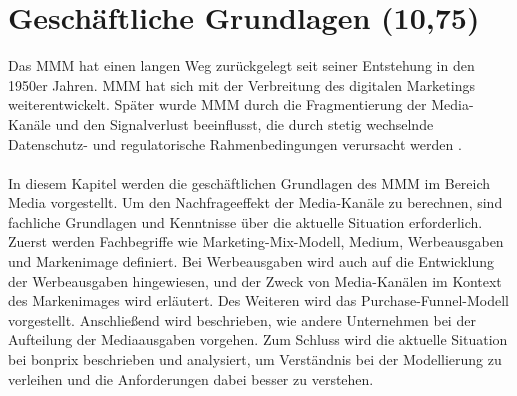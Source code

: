 \newpage
\section{Geschäftliche Grundlagen (10,75)}
\label{GeschäftlicheGrundlagen}
Das \ac{MMM} hat einen langen Weg zurückgelegt seit seiner Entstehung in den 1950er Jahren. \ac{MMM} hat sich mit der Verbreitung des digitalen Marketings weiterentwickelt. Später wurde \ac{MMM} durch die Fragmentierung der Media-Kanäle und den Signalverlust beeinflusst, die durch stetig wechselnde Datenschutz- und regulatorische Rahmenbedingungen verursacht werden \cite{MMMdef}.\\\\
In diesem Kapitel werden die geschäftlichen Grundlagen des \ac{MMM} im Bereich Media vorgestellt. Um den Nachfrageeffekt der Media-Kanäle zu berechnen, sind fachliche Grundlagen und Kenntnisse über die aktuelle Situation erforderlich. Zuerst werden Fachbegriffe wie Marketing-Mix-Modell, Medium, Werbeausgaben und Markenimage definiert. Bei Werbeausgaben wird auch auf die Entwicklung der Werbeausgaben hingewiesen, und der Zweck von Media-Kanälen im Kontext des Markenimages wird erläutert. Des Weiteren wird das Purchase-Funnel-Modell vorgestellt. Anschließend wird beschrieben, wie andere Unternehmen bei der Aufteilung der Mediaausgaben vorgehen. Zum Schluss wird die aktuelle Situation bei bonprix beschrieben und analysiert, um Verständnis bei der Modellierung zu verleihen und die Anforderungen dabei besser zu verstehen.
